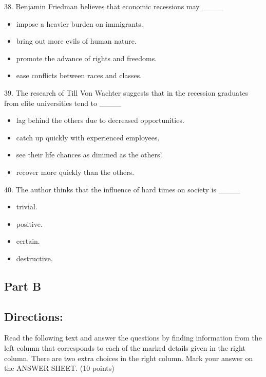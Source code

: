 \documentclass[UTF8,11pt]{ctexart}
\begin{document}
38. Benjamin Friedman believes that economic recessions may \_\_\_\_


\begin{itemize}[leftmargin=2em,itemsep=.2em,topsep=.4em]\item[A.] impose a heavier burden on immigrants.
\item[B.] bring out more evils of human nature.
\item[C.] promote the advance of rights and freedoms.
\item[D.] ease conflicts between races and classes.
\end{itemize}

39. The research of Till Von Wachter suggests that in the recession graduates from elite universities tend to \_\_\_\_


\begin{itemize}[leftmargin=2em,itemsep=.2em,topsep=.4em]\item[A.] lag behind the others due to decreased opportunities.
\item[B.] catch up quickly with experienced employees.
\item[C.] see their life chances as dimmed as the others’.
\item[D.] recover more quickly than the others.
\end{itemize}

40. The author thinks that the influence of hard times on society is \_\_\_\_


\begin{itemize}[leftmargin=2em,itemsep=.2em,topsep=.4em]\item[A.] trivial.
\item[B.] positive.
\item[C.] certain.
\item[D.] destructive.
\end{itemize}

\subsection*{\textbf{Part B}}


\subsection*{\textbf{Directions:}}


Read the following text and answer the questions by finding information from the left column that corresponds to each of the marked details given in the right column. There are two extra choices in the right column. Mark your answer on the ANSWER SHEET. (10 points)
\end{document}
